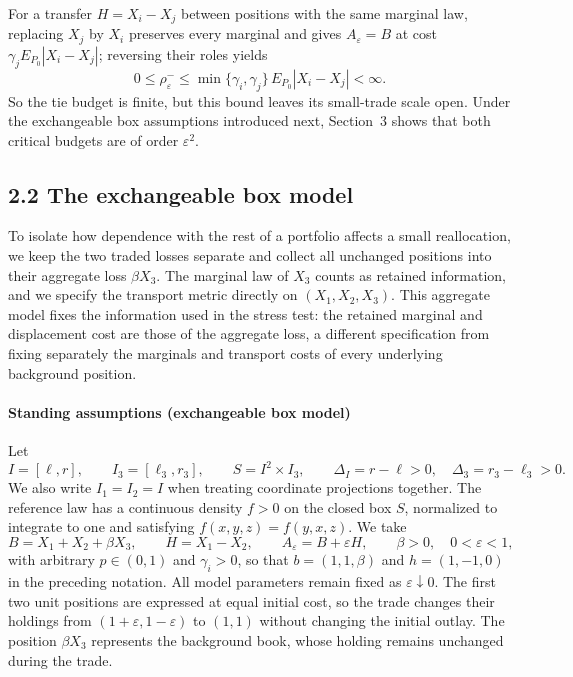 For a transfer \(H=X_i-X_j\) between positions with the same marginal law, replacing \(X_j\) by \(X_i\) preserves every marginal and gives \(A_\varepsilon=B\) at cost \(\gamma_jE_{P_0}|X_i-X_j|\); reversing their roles yields
\[
0\le\rho^-_\varepsilon
\le\min\{\gamma_i,\gamma_j\}\,E_{P_0}|X_i-X_j|<\infty.
\]
So the tie budget is finite, but this bound leaves its small-trade scale open. Under the exchangeable box assumptions introduced next, Section~3 shows that both critical budgets are of order \(\varepsilon^2\).

\subsection{2.2 The exchangeable box model}\label{model:critical-box}
To isolate how dependence with the rest of a portfolio affects a small reallocation, we keep the two traded losses separate and collect all unchanged positions into their aggregate loss \(\beta X_3\). The marginal law of \(X_3\) counts as retained information, and we specify the transport metric directly on \((X_1,X_2,X_3)\). This aggregate model fixes the information used in the stress test: the retained marginal and displacement cost are those of the aggregate loss, a different specification from fixing separately the marginals and transport costs of every underlying background position.

\paragraph{Standing assumptions (exchangeable box model)}\label{assumption:critical-box}
Let
\[
I=[\ell,r],\qquad I_3=[\ell_3,r_3],\qquad
S=I^2\times I_3,\qquad \Delta_I=r-\ell>0,\quad \Delta_3=r_3-\ell_3>0.
\]
We also write \(I_1=I_2=I\) when treating coordinate projections together.
The reference law has a continuous density \(f>0\) on the closed box \(S\), normalized to integrate to one and satisfying
\(f(x,y,z)=f(y,x,z)\).
We take
\[
B=X_1+X_2+\beta X_3,\qquad H=X_1-X_2,\qquad
A_\varepsilon=B+\varepsilon H,\qquad
\beta>0,\quad 0<\varepsilon<1,
\]
with arbitrary \(p\in(0,1)\) and \(\gamma_i>0\), so that \(b=(1,1,\beta)\) and \(h=(1,-1,0)\) in the preceding notation. All model parameters remain fixed as \(\varepsilon\downarrow0\). The first two unit positions are expressed at equal initial cost, so the trade changes their holdings from \((1+\varepsilon,1-\varepsilon)\) to \((1,1)\) without changing the initial outlay. The position \(\beta X_3\) represents the background book, whose holding remains unchanged during the trade.

